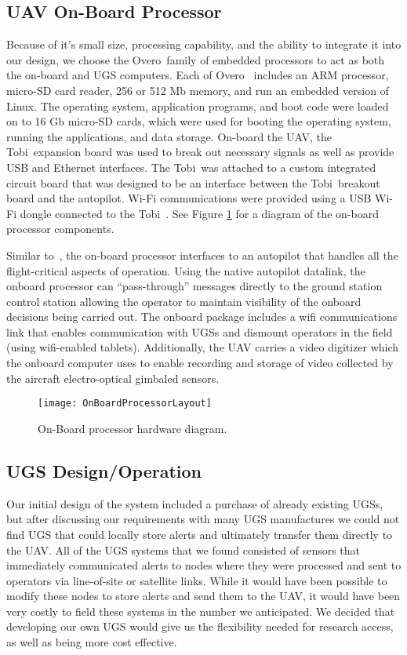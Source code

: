 \documentclass[letterpaper, 12 pt, conference]{ieeeconf}  %
\DeclareRobustCommand{\overo}{Overo\textsuperscript{\textregistered}}
\DeclareRobustCommand{\tobi}{Tobi~}
\theoremstyle{definition}
\begin{document}
\subsection{UAV On-Board Processor}
Because of it's small size, processing capability, and the ability to integrate it into our design, we choose the \overo ~family of embedded processors\cite{gumstixwebsite} to act as both the on-board and UGS computers. Each of \overo~ includes an ARM processor, micro-SD card reader, 256 or 512 Mb memory, and run an embedded version of Linux. The operating system, application programs, and boot code were loaded on to 16 Gb micro-SD cards, which were used for booting the operating system, running the applications, and data storage. On-board the UAV, the \tobi expansion board was used to break out necessary signals as well as provide USB and Ethernet interfaces. The \tobi was attached to a custom integrated circuit board that was designed to be an interface between the \tobi breakout board and the autopilot. Wi-Fi communications were provided using a USB Wi-Fi dongle connected to the \tobi. See Figure \ref{fig:OnBoardProcessorLayout} for a diagram of the on-board processor components.

Similar to~\cite{li2009multiple}, the on-board processor interfaces to an autopilot that handles all the flight-critical aspects of operation. Using the native autopilot datalink, the onboard processor can ``pass-through'' messages directly to the ground station control station allowing the operator to maintain visibility of the onboard decisions being carried out. The onboard package includes a wifi communications link that enables communication with UGSs and dismount operators in the field (using wifi-enabled tablets). Additionally, the UAV carries a video digitizer which the onboard computer uses to enable recording and storage of video collected by the aircraft electro-optical gimbaled sensors.

\begin{figure}[htb]
\centering
      \texttt{[image: OnBoardProcessorLayout]}
      \caption{On-Board processor hardware diagram.}
      \label{fig:OnBoardProcessorLayout}
\end{figure}

\subsection{UGS Design/Operation}
Our initial design of the system included a purchase of already existing UGSs, but after discussing our requirements with many UGS manufactures we could not find UGS that could locally store alerts and ultimately transfer them directly to the UAV. All of the UGS systems that we found consisted of sensors that immediately communicated alerts to nodes where they were processed and sent to operators via line-of-site or satellite links. While it would have been possible to modify these nodes to store alerts and send them to the UAV, it would have been very costly to field these systems in the number we anticipated. We decided that developing our own UGS would give us the flexibility needed for research access, as well as being more cost effective.
\end{document}

